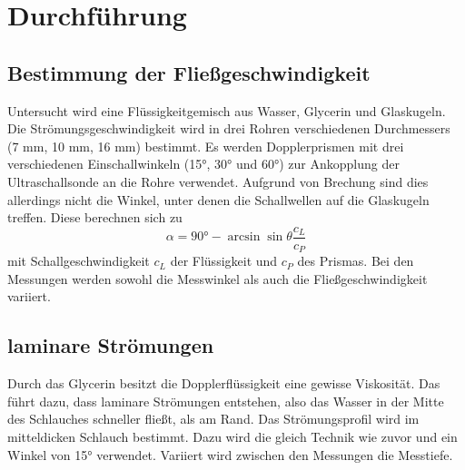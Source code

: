 \section{Durchführung}
\label{sec:Durchführung}

\subsection{Bestimmung der Fließgeschwindigkeit}
    Untersucht wird eine Flüssigkeitgemisch aus Wasser, Glycerin und Glaskugeln. 
    Die Strömungsgeschwindigkeit wird in drei Rohren verschiedenen Durchmessers (7 mm,
    10 mm, 16 mm) bestimmt. Es werden Dopplerprismen mit drei verschiedenen Einschallwinkeln
    (15°, 30° und 60°) zur Ankopplung der Ultraschallsonde an die Rohre verwendet. 
    Aufgrund von Brechung sind dies allerdings nicht die Winkel, unter denen die Schallwellen
    auf die Glaskugeln treffen. Diese berechnen sich zu
    \begin{equation}
        \alpha = 90° - \arcsin{\sin{\theta}\dfrac{c_L}{c_P}}
    \end{equation}
    mit Schallgeschwindigkeit $c_L$ der Flüssigkeit und $c_P$ des Prismas. Bei den Messungen werden 
    sowohl die Messwinkel als auch die Fließgeschwindigkeit variiert.

\subsection{laminare Strömungen}
    Durch das Glycerin besitzt die Dopplerflüssigkeit eine gewisse Viskosität. Das führt dazu,
    dass laminare Strömungen entstehen, also das Wasser in der Mitte des Schlauches
    schneller fließt, als am Rand. Das Strömungsprofil wird im mitteldicken Schlauch 
    bestimmt. Dazu wird die gleich Technik wie zuvor und ein Winkel von 15° verwendet.
    Variiert wird zwischen den Messungen die Messtiefe.

